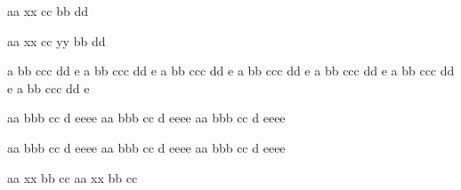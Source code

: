 \bTABLE
\bTR \bTD aa \eTD \bTD[nr=2] xx \eTD \bTD cc \eTD \eTR
\bTR \bTD bb \eTD                    \bTD dd \eTD \eTR
\eTABLE

\unskip \quad \ignorespaces

\bTABLE
\bTR \bTD aa \eTD \bTD[nr=2] xx \eTD \bTD cc \eTD \bTD yy \eTD \eTR
\bTR \bTD bb \eTD                    \bTD dd \eTD              \eTR
\eTABLE

\unskip \egroup
\StopExample


\StartExample
\setupTABLE[column][odd][background=color,backgroundcolor=red]
\setupTABLE[row][odd][background=color,backgroundcolor=blue]
\setupTABLE[even][odd][background=color,backgroundcolor=red]

\bTABLE
\bTR \bTD a \eTD \bTD bb \eTD \bTD ccc \eTD \bTD dd \eTD \bTD e \eTD \eTR
\bTR \bTD a \eTD \bTD bb \eTD \bTD ccc \eTD \bTD dd \eTD \bTD e \eTD \eTR
\bTR \bTD a \eTD \bTD bb \eTD \bTD ccc \eTD \bTD dd \eTD \bTD e \eTD \eTR
\bTR \bTD a \eTD \bTD bb \eTD \bTD ccc \eTD \bTD dd \eTD \bTD e \eTD \eTR
\bTR \bTD a \eTD \bTD bb \eTD \bTD ccc \eTD \bTD dd \eTD \bTD e \eTD \eTR
\bTR \bTD a \eTD \bTD bb \eTD \bTD ccc \eTD \bTD dd \eTD \bTD e \eTD \eTR
\bTR \bTD a \eTD \bTD bb \eTD \bTD ccc \eTD \bTD dd \eTD \bTD e \eTD \eTR
\eTABLE
\StopExample


\StartExample
\hbox \bgroup \ignorespaces

\bTABLE
\setupTABLE[column][1][width=2cm]
\bTR \bTD aa \eTD \bTD bbb \eTD \bTD cc \eTD \bTD d \eTD \bTD eeee \eTD \eTR
\bTR \bTD aa \eTD \bTD bbb \eTD \bTD cc \eTD \bTD d \eTD \bTD eeee \eTD \eTR
\bTR \bTD aa \eTD \bTD bbb \eTD \bTD cc \eTD \bTD d \eTD \bTD eeee \eTD \eTR
\eTABLE

\unskip \quad \ignorespaces

\bTABLE
\setupTABLE[column][width=3em]
\bTR \bTD aa \eTD \bTD bbb \eTD \bTD cc \eTD \bTD d \eTD \bTD eeee \eTD \eTR
\bTR \bTD aa \eTD \bTD bbb \eTD \bTD cc \eTD \bTD d \eTD \bTD eeee \eTD \eTR
\bTR \bTD aa \eTD \bTD bbb \eTD \bTD cc \eTD \bTD d \eTD \bTD eeee \eTD \eTR
\eTABLE

\unskip \egroup
\StopExample


\StartExample
\hbox \bgroup \ignorespaces

\bTABLE
\bTR \bTD aa \eTD \bTD[nr=2] xx \eTD \bTD bb \eTD \bTD cc \eTD \eTR
\bTR \bTD aa \eTD \bTD[nr=2] xx \eTD \bTD bb \eTD \bTD cc \eTD \eTR
\eTABLE

